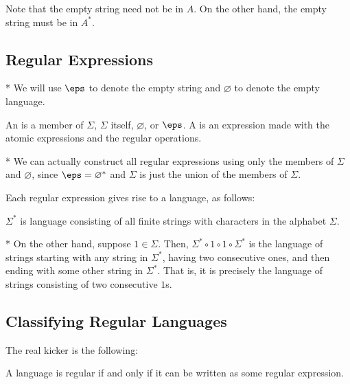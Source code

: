 Note that the empty string need not be in $A$. On the other hand, the empty string must be in $A^*$.

\subsection{Regular Expressions}

\begin{defn}*
	We will use $\eps$ to denote the empty string and $\varnothing$ to denote the empty language.
\end{defn}

\begin{defn}
	An  is a member of $\Sigma$, $\Sigma$ itself, $\varnothing$, or $\eps$. A  is an expression made with the atomic expressions and the regular operations.
\end{defn}

\begin{fact}*
	We can actually construct all regular expressions using only the members of $\Sigma$ and $\varnothing$, since $\eps = \varnothing^*$ and $\Sigma$ is just the union of the members of $\Sigma$.
\end{fact}

Each regular expression gives rise to a language, as follows:

\begin{exm}
	$\Sigma^*$ is language consisting of all finite strings with characters in the alphabet $\Sigma$.
\end{exm}

\begin{exm}*
	On the other hand, suppose $1\in \Sigma$. Then, $\Sigma^* \circ 1 \circ 1 \circ \Sigma^*$ is the language of strings starting with any string in $\Sigma^*$, having two consecutive ones, and then ending with some other string in $\Sigma^*$. That is, it is precisely the language of strings consisting of two consecutive $1$s.
\end{exm}

\subsection{Classifying Regular Languages}

The real kicker is the following:

\begin{thm}
	A language is regular if and only if it can be written as some regular expression.
\end{thm}

